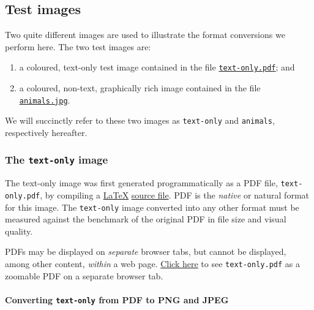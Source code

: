 \documentclass[
  a4paper,
]{article}
\providecommand{\tightlist}{%
  \setlength{\itemsep}{0pt}\setlength{\parskip}{0pt}}
\begin{document}
\hypertarget{test-images}{%
\subsection{Test images}\label{test-images}}

Two quite different images are used to illustrate the format conversions
we perform here. The two test images are:

\begin{enumerate}
\tightlist
\item
  a coloured, text-only test image contained in the file
  \href{images/text-only.pdf}{\texttt{text-only.pdf}}; and
\item
  a coloured, non-text, graphically rich image contained in the file
  \href{images/animals.jpg}{\texttt{animals.jpg}}.
\end{enumerate}

We will succinctly refer to these two images as \texttt{text-only} and
\texttt{animals}, respectively hereafter.

\hypertarget{the-text-only-image}{%
\subsubsection{\texorpdfstring{The \texttt{text-only}
image}{The text-only image}}\label{the-text-only-image}}

The text-only image was first generated programmatically as a PDF file,
\texttt{text-only.pdf}, by compiling a
\href{https://www.latex-project.org/}{LaTeX}
\href{auxiliary/text-only.tex}{source file}. PDF is the \emph{native} or
natural format for this image. The \texttt{text-only} image converted
into any other format must be measured against the benchmark of the
original PDF in file size and visual quality.

PDFs may be displayed on \emph{separate} browser tabs, but cannot be
displayed, among other content, \emph{within} a web page.
\href{images/text-only.pdf}{Click here} to see \texttt{text-only.pdf} as
a zoomable PDF on a separate browser tab.

\hypertarget{converting-text-only-from-pdf-to-png-and-jpeg}{%
\paragraph{\texorpdfstring{Converting \texttt{text-only} from PDF to PNG
and
JPEG}{Converting text-only from PDF to PNG and JPEG}}\label{converting-text-only-from-pdf-to-png-and-jpeg}}
\end{document}
